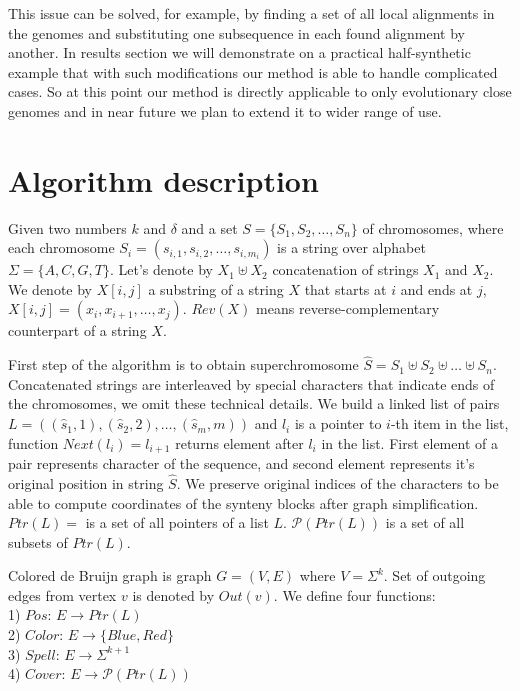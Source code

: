 \documentclass[a4paper, 12pt]{scrartcl}
\begin{document}
This issue can be solved, for example, by finding a set of all local alignments in the genomes and substituting one subsequence in each found alignment
by another. In results section we will demonstrate on a practical half-synthetic example that with such modifications our method is able to handle
complicated cases. So at this point our method is directly applicable to only evolutionary close genomes and  in near future we plan to extend it to
wider range of use.

\section{Algorithm description}

Given two numbers \(k\) and \(\delta\) and a set \(S = \lbrace S_{1}, S_{2}, \ldots, S_{n} \rbrace \) of chromosomes,
where each chromosome  \(S_{i} = (s_{i, 1}, s_{i, 2}, \ldots, s_{i, m_i})\) is a string over alphabet \(\Sigma = \lbrace A, C, G, T \rbrace\).
Let's denote by \(X_{1} \uplus X_{2}\) concatenation of strings \(X_{1}\) and \(X_{2}\). We denote by \(X[i, j]\) a substring of a string \(X\) that
starts at \(i\) and ends at \(j\), \(X[i, j] = (x_{i}, x_{i + 1}, \ldots, x_{j}) \). \(Rev(X)\) means reverse-complementary counterpart of a string \(X\).

First step of the algorithm is to obtain superchromosome \(\hat{S} = S_{1} \uplus S_{2} \uplus \ldots \uplus S_{n} \). Concatenated
strings are interleaved by special characters that indicate ends of the chromosomes, we omit these technical details. We build a linked list of
pairs \(L = ((\hat{s}_1, 1), (\hat{s}_2, 2), \ldots, (\hat{s}_{m}, m))\) and \(l_i\) is a pointer to \(i\)-th item in the list, function \(Next(l_i) = l_{i + 1}\) returns
element after \(l_i\) in the list.
First element of a pair represents character of the sequence, and second element represents it's original position in string \(\hat{S}\). We preserve
original indices of the characters to be able to compute coordinates of the synteny blocks after graph simplification.
\(Ptr(L) = \) is a set of all pointers of a list \(L\). \( \mathcal P \left({Ptr(L)}\right) \) is a set of all subsets of \(Ptr(L)\).

\newpage

Colored de Bruijn graph is graph \(G = (V, E) \) where \(V = \Sigma ^ k \). Set of outgoing edges from vertex \(v\) is denoted by \(Out(v)\). We define four functions: \\
1) \(Pos : \, E \rightarrow Ptr(L) \) \\
2) \(Color : \, E \rightarrow \lbrace Blue, Red \rbrace \) \\
3) \(Spell: \, E \rightarrow \Sigma ^ {k + 1} \) \\
4) \(Cover: \, E \rightarrow  \mathcal P \left({Ptr(L)}\right) \)
\end{document}
